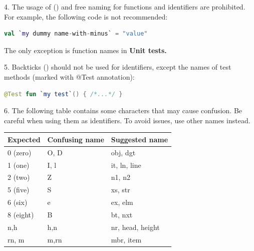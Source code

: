 4.	The usage of (\textbf{}) and free naming for functions and identifiers are prohibited. For example, the following code is not recommended:



\begin{lstlisting}[language=Kotlin]
val `my dummy name-with-minus` = "value" 
\end{lstlisting}


The only exception is function names in \textbf{Unit tests.}



5.	Backticks (\textbf{}) should not be used for identifiers, except the names of test methods (marked with @Test annotation):

\begin{lstlisting}[language=Kotlin]
 @Test fun `my test`() { /*...*/ }
\end{lstlisting}
6.  The following table contains some characters that may cause confusion. Be careful when using them as identifiers. To avoid issues, use other names instead.

\begin{center}

\begin{tabular}{ |p{5.0cm}|p{5.0cm}|p{5.0cm}| }

\hline

Expected&Confusing name&Suggested name\\

\hline

 0 (zero)      & O, D                     & obj, dgt         \\

 1 (one)       & I, l                     & it, ln, line     \\

 2 (two)       & Z                        & n1, n2           \\

 5 (five)      & S                        & xs, str          \\

 6 (six)       & e                        & ex, elm          \\

 8 (eight)     & B                        & bt, nxt          \\

 n,h           & h,n                      & nr, head, height \\

 rn, m         & m,rn                     & mbr, item        \\

\hline

\end{tabular}

\end{center}

